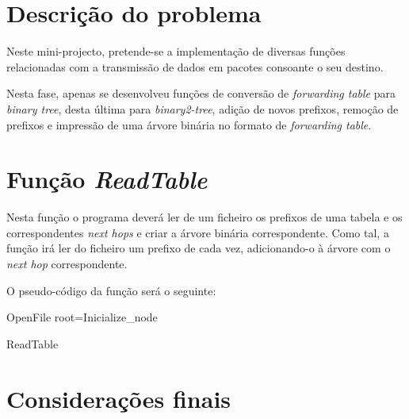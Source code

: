 \documentclass[a4paper]{article}
\begin{document}

\section{Descrição do problema}
Neste mini-projecto, pretende-se a implementação de diversas funções relacionadas com a transmissão de dados em pacotes consoante
o seu destino.

Nesta fase, apenas se desenvolveu funções de conversão de \textit{forwarding table} para \textit{binary tree}, desta última para
\textit{binary2-tree}, adição de novos prefixos, remoção de prefixos e impressão de uma árvore binária no formato de
\textit{forwarding table}.

\section{Função \textit{ReadTable}}
Nesta função o programa deverá ler de um ficheiro os prefixos de uma tabela e os correspondentes \textit{next hops} e criar a 
árvore binária correspondente.
Como tal, a função irá ler do ficheiro um prefixo de cada vez, adicionando-o à árvore com o \textit{next hop} correspondente.

O pseudo-código da função será o seguinte:

\begin{algorithm}
\label{ReadTable}
  OpenFile 
  root=Inicialize_node
  \caption{ReadTable}
\end{algorithm}

\section{Considerações finais}
\end{document}
